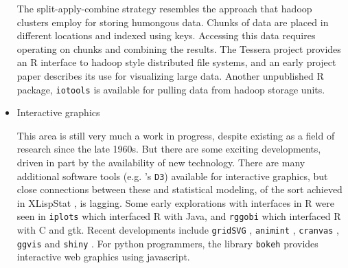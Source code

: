 \documentclass[11pt]{article}
\begin{document}
\begin{itemize}
The split-apply-combine strategy resembles the approach that hadoop \citep{hadoop} clusters employ for storing humongous data. Chunks of data are placed in different locations and indexed using keys. Accessing this data requires operating on chunks and combining the results. The Tessera project \citep{tessera} provides an R interface to hadoop style distributed file systems, and an early project paper \citep{guha} describes its use for visualizing large data. Another unpublished R package, {\tt iotools} \citep{urbanek} is available for pulling data from hadoop storage units.


\item Interactive graphics

This area is still very much a work in progress, despite existing as a field of research since the late 1960s. But there are some exciting developments, driven in part by the availability of new technology. There are many additional software tools (e.g. \citet{Bostock:2011}'s  {\tt D3}) available for interactive graphics, but close connections between these and statistical modeling, of the sort achieved in XLispStat \citep{Ti91}, is lagging. Some early explorations with interfaces in R were seen in {\tt iplots} \citep{iplots} which interfaced R with Java, and {\tt rggobi} \citep{rggobi-rnews} which interfaced R with C and gtk. Recent developments include {\tt gridSVG} \citep{gridSVG}, {\tt animint} \citep{animint}, {\tt cranvas} \citep{xie2014reactive}, {\tt ggvis} \citep{ggvis} and {\tt shiny} \citep{shiny}.  For python programmers, the library {\tt bokeh} \citep{bokeh} provides interactive web graphics using javascript.


\end{itemize}
\end{document}
